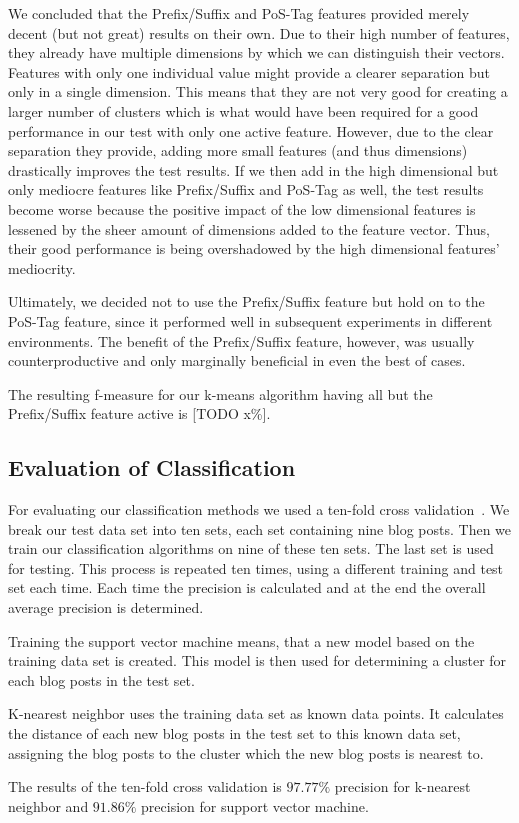We concluded that the Prefix/Suffix and PoS-Tag features provided merely decent (but not great) results on their own.
Due to their high number of features, they already have multiple dimensions by which we can distinguish their vectors.
Features with only one individual value might provide a clearer separation but only in a single dimension.
This means that they are not very good for creating a larger number of clusters which is what would have been required for a good performance in our test with only one active feature.
However, due to the clear separation they provide, adding more small features (and thus dimensions) drastically improves the test results.
If we then add in the high dimensional but only mediocre features like Prefix/Suffix and PoS-Tag as well, the test results become worse because the positive impact of the low dimensional features is lessened by the sheer amount of dimensions added to the feature vector.
Thus, their good performance is being overshadowed by the high dimensional features' mediocrity.


Ultimately, we decided not to use the Prefix/Suffix feature but hold on to the PoS-Tag feature, since it performed well in subsequent experiments in different environments.
The benefit of the Prefix/Suffix feature, however, was usually counterproductive and only marginally beneficial in even the best of cases.


The resulting f-measure for our k-means algorithm having all but the Prefix/Suffix feature active is [TODO x\%].


\subsection{Evaluation of Classification}
For evaluating our classification methods we used a ten-fold cross validation~\cite{kohavi1995study}.
We break our test data set into ten sets, each set containing nine blog posts.
Then we train our classification algorithms on nine of these ten sets.
The last set is used for testing.
This process is repeated ten times, using a different training and test set each time.
Each time the precision is calculated and at the end the overall average precision is determined.


Training the support vector machine means, that a new model based on the training data set is created.
This model is then used for determining a cluster for each blog posts in the test set.


K-nearest neighbor uses the training data set as known data points.
It calculates the distance of each new blog posts in the test set to this known data set, assigning the blog posts to the cluster which the new blog posts is nearest to.


The results of the ten-fold cross validation is $97.77\%$ precision for k-nearest neighbor and $91.86\%$ precision for support vector machine.
